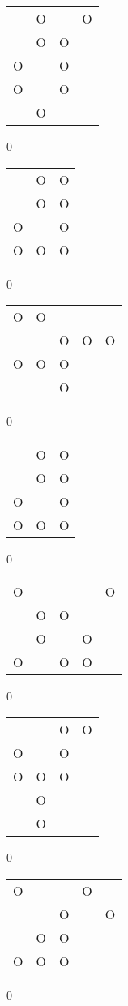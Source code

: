 \begin{tabular}{|m{0.2cm}m{0.2cm}m{0.2cm}m{0.2cm}|}\hline
 &O& &O\\
 &O&O& \\
O& &O& \\
O& &O& \\
 &O& & \\
\hline\end{tabular}0
\begin{tabular}{|m{0.2cm}m{0.2cm}m{0.2cm}|}\hline
 &O&O\\
 &O&O\\
O& &O\\
O&O&O\\
\hline\end{tabular}0
\begin{tabular}{|m{0.2cm}m{0.2cm}m{0.2cm}m{0.2cm}m{0.2cm}|}\hline
O&O& & & \\
 & &O&O&O\\
O&O&O& & \\
 & &O& & \\
\hline\end{tabular}0
\begin{tabular}{|m{0.2cm}m{0.2cm}m{0.2cm}|}\hline
 &O&O\\
 &O&O\\
O& &O\\
O&O&O\\
\hline\end{tabular}0
\begin{tabular}{|m{0.2cm}m{0.2cm}m{0.2cm}m{0.2cm}m{0.2cm}|}\hline
O& & & &O\\
 &O&O& & \\
 &O& &O& \\
O& &O&O& \\
\hline\end{tabular}0
\begin{tabular}{|m{0.2cm}m{0.2cm}m{0.2cm}m{0.2cm}|}\hline
 & &O&O\\
O& &O& \\
O&O&O& \\
 &O& & \\
 &O& & \\
\hline\end{tabular}0
\begin{tabular}{|m{0.2cm}m{0.2cm}m{0.2cm}m{0.2cm}m{0.2cm}|}\hline
O& & &O& \\
 & &O& &O\\
 &O&O& & \\
O&O&O& & \\
\hline\end{tabular}0

